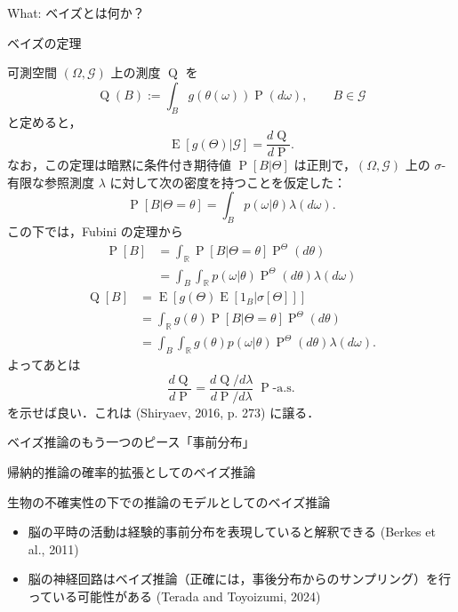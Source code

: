 \documentclass[
  ignorenonframetext,
]{beamer}
\begin{document}
\begin{frame}{What: ベイズとは何か？}
\begin{block}{ベイズの定理}
\begin{tcolorbox}
可測空間 \((\Omega,\mathcal{G})\) 上の測度 \(\operatorname{Q}\) を \[
\operatorname{Q}(B):=\int_B g(\theta(\omega))\operatorname{P}(d\omega),\qquad B\in\mathcal{G}
\] と定めると， \[
\operatorname{E}[g(\Theta)|\mathcal{G}]=\frac{d \operatorname{Q}}{d \operatorname{P}}.
\] なお，この定理は暗黙に条件付き期待値 \(\operatorname{P}[B|\Theta]\)
は正則で，\((\Omega,\mathcal{G})\) 上の \(\sigma\)-有限な参照測度
\(\lambda\) に対して次の密度を持つことを仮定した： \[
\operatorname{P}[B|\Theta=\theta]=\int_B p(\omega|\theta)\lambda(d\omega).
\] この下では，Fubini の定理から \[
\begin{align*}
  \operatorname{P}[B]&=\int_\mathbb{R}\operatorname{P}[B|\Theta=\theta]\operatorname{P}^\Theta(d\theta)\\
  &=\int_B\int_\mathbb{R}p(\omega|\theta)\operatorname{P}^\Theta(d\theta)\lambda(d\omega)
\end{align*}
\] \[
\begin{align*}
  \operatorname{Q}[B]&=\operatorname{E}[g(\Theta)\operatorname{E}[1_B|\sigma[\Theta]]]\\
  &=\int_\mathbb{R}g(\theta)\operatorname{P}[B|\Theta=\theta]\operatorname{P}^\Theta(d\theta)\\
  &=\int_B\int_\mathbb{R}g(\theta)p(\omega|\theta)\operatorname{P}^\Theta(d\theta)\lambda(d\omega).
\end{align*}
\] よってあとは \[
\frac{d \operatorname{Q}}{d \operatorname{P}}=\frac{d \operatorname{Q}/d\lambda}{d \operatorname{P}/d\lambda}\;\operatorname{P}\text{-a.s.}
\] を示せば良い．これは (Shiryaev, 2016, p. 273) に譲る．

\end{tcolorbox}
\end{block}

\begin{block}{ベイズ推論のもう一つのピース「事前分布」}
\label{ux30d9ux30a4ux30baux63a8ux8ad6ux306eux3082ux3046ux4e00ux3064ux306eux30d4ux30fcux30b9ux4e8bux524dux5206ux5e03}
\end{block}

\begin{block}{帰納的推論の確率的拡張としてのベイズ推論}
\label{ux5e30ux7d0dux7684ux63a8ux8ad6ux306eux78baux7387ux7684ux62e1ux5f35ux3068ux3057ux3066ux306eux30d9ux30a4ux30baux63a8ux8ad6}
\end{block}

\begin{block}{生物の不確実性の下での推論のモデルとしてのベイズ推論}
\label{ux751fux7269ux306eux4e0dux78baux5b9fux6027ux306eux4e0bux3067ux306eux63a8ux8ad6ux306eux30e2ux30c7ux30ebux3068ux3057ux3066ux306eux30d9ux30a4ux30baux63a8ux8ad6}
\begin{itemize}
\item
  脳の平時の活動は経験的事前分布を表現していると解釈できる (Berkes et
  al., 2011)
\item
  脳の神経回路はベイズ推論（正確には，事後分布からのサンプリング）を行っている可能性がある
  (Terada and Toyoizumi, 2024)
\end{itemize}
\end{block}
\end{frame}
\end{document}
